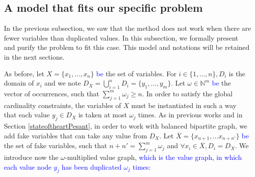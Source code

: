 \documentclass[jair,twoside,11pt,theapa]{article}
\newcommand{\minor}[1]{\textcolor{blue}{#1}}
\newcommand{\N}{\mathbb{N}}
\newcommand{\var}[1]{x_{#1}}
\newcommand{\Domain}{D}
\newcommand{\domainof}[1]{\Domain_{#1}}
\begin{document}

\subsection{A model that fits our specific problem }
\label{RefiningProblem}
In the previous subsection, we saw that the method does not work when there are fewer variables than duplicated values. In this subsection, we formally present and purify the problem to fit this case. This model and notations will be retained in the next sections.

As before, let $X=\lbrace \var{1}, \ldots, \var{n}\rbrace$ \minor{be} the set of variables. For $i \in \lbrace 1, \ldots, n \rbrace, D_i$ is the domain of $x_i$ and we note $D_X=\bigcup_{i=1}^n D_i = \lbrace y_1, \ldots, y_m \rbrace$. Let $\omega \in \N^m$ \minor{be} the  vector of occurrences, such that $\sum_{j=1}^m \omega_j \geq n$. In order to satisfy the global cardinality constraints, the variables of $X$ must be instantiated in such a way that each value $y_j \in D_X$ is taken at most $\omega_j$ times. As in previous works \cite{PesantQZ12} and in Section \ref{stateoftheartPesant}, in order to work with balanced bipartite graph,  we add fake variables that can take any value from $D_X$. Let $\overline{X} = \lbrace \var{n+1}, \ldots \var{n+n'} \rbrace$ \minor{be}  the set of fake variables, such that $n+n' = \sum_{j=1}^m \omega_j$ and $\forall \var{i} \in \overline{X}, \domainof{i}= D_X$. 
We introduce now the $\omega$-multiplied value graph, \minor{which is the value graph, in which each value node $y_j$ has been duplicated $\omega_j$ times}:
\end{document}
